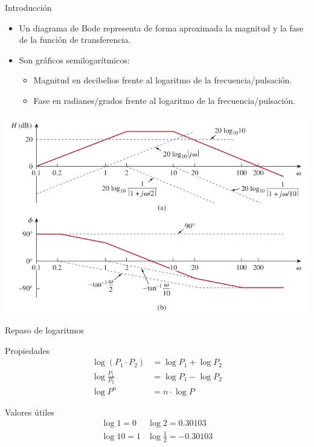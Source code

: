\documentclass[aspectratio=169, usenames,svgnames,dvipsnames]{beamer}
\begin{document}
\begin{frame}[label={sec:org02e3c6e}]{Introducción}
\begin{itemize}
\item Un diagrama de Bode representa de forma \alert{aproximada} la magnitud y la fase de la función de transferencia.
\item Son \alert{gráficos semilogarítmicos}:
\begin{itemize}
\item Magnitud en \alert{decibelios} frente al logaritmo de la frecuencia/pulsación.
\item Fase en radianes/grados frente al logaritmo de la frecuencia/pulsación.
\end{itemize}
\end{itemize}
\begin{center}
\includegraphics[height=0.5\textheight]{../figs/Bode.pdf}
\end{center}
\end{frame}

\begin{frame}[label={sec:org3c486ed}]{Repaso de logaritmos}
\begin{block}{Propiedades}
\begin{align*}
  \log (P_1 \cdot P_2) &= \log P_1 + \log P_2\\
  \log \frac{P_1}{P_2} &= \log P_1 - \log P_2\\
  \log P^n &= n \cdot \log P
\end{align*}
\end{block}

\begin{block}{Valores útiles}
\[
\begin{array}{ll}
  \log 1 = 0 & \log 2 = 0.30103\\
  \log 10 = 1 & \log \frac{1}{2} = -0.30103
\end{array}
\]
\end{block}
\end{frame}
\end{document}

